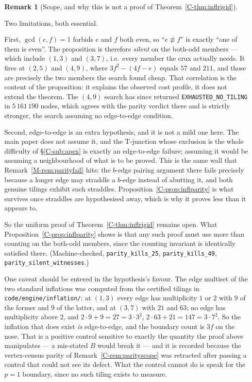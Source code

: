 \documentclass[11pt,reqno]{amsart}
\theoremstyle{plain}
\theoremstyle{definition}
\newtheorem{remark}[theorem]{Remark}
\begin{document}
\begin{remark}[Scope, and why this is not a proof of Theorem~\ref{C-thm:inflrigid}]\label{O-inflparity}

Two limitations, both essential.

First, $\gcd(e,f)=1$ forbids $e$ and $f$ both even, so ``$e\not\equiv f$'' is exactly ``one of them is
even''. The proposition is therefore \emph{silent} on the both-odd members --- which include $(1,3)$ and
$(3,7)$, i.e.\ every member the crux actually needs. It fires at $(2,5)$ and $(4,9)$, where
$3f^2-(4f-e)$ equals $57$ and $211$, and those are precisely the two members the search found cheap.
That correlation is the content of the proposition: it explains the observed cost profile, it does not
extend the theorem. The $(4,9)$ search has since returned \texttt{EXHAUSTED\_NO\_TILING} in
$5\,161\,190$ nodes, which agrees with the parity verdict there and is strictly stronger, the search
assuming no edge-to-edge condition.

Second, edge-to-edge is an extra hypothesis, and it is not a mild one here. The main paper does not
assume it, and the T-junction whose exclusion is the whole difficulty of \S\ref{C-sub:apex} is exactly an
edge-to-edge failure; assuming it would be assuming a neighbourhood of what is to be proved. This is the
same wall that Remark~\ref{M-rem:parityfail} hits: the $b$-edge pairing argument there fails precisely
because a longer edge may straddle a $b$-edge instead of abutting it, and both genuine tilings exhibit
such straddles. Proposition~\ref{C-prop:inflparity} is what survives once straddles are hypothesised away,
which is why it proves less than it appears to.

So the uniform proof of Theorem~\ref{C-thm:inflrigid} remains open. What Proposition~\ref{C-prop:inflparity}
shows is that any such proof must use more than counting on the both-odd members, since the counting
invariant is identically satisfied there. \textup{(}Machine-checked, \texttt{parity\_kills\_25},
\texttt{parity\_kills\_49}, \texttt{parity\_silent\_witnesses}.\textup{)}

One caveat should be entered in the hypothesis's favour. The edge multiset of the two standard
inflations was computed from the certified tilings in \texttt{code/engine/inflation/}: at $(1,3)$ every
edge has multiplicity $1$ or $2$ with $9$ of the former and $9$ of the latter, and at $(3,7)$ with $21$
and $63$; no edge has multiplicity above $2$, and $2\cdot 9+9=27=3\cdot 3^2$, $2\cdot 63+21=147=3\cdot
7^2$. So the inflation that does exist \emph{is} edge-to-edge, and the boundary count is $3f$ on the
nose. That is a positive control sensitive to exactly the quantity the proof above manipulates --- a
mis-stated $B$ would break it --- and it is recorded because the vertex-census parity of
Remark~\ref{C-rem:parityscope} was retracted after passing a control that could not see its defect.
What the control cannot do is speak for the $p=1$ boundary, since no such tiling exists to measure.
\end{remark}
\end{document}
